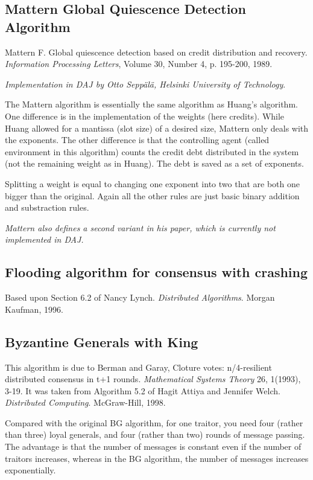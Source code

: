 \documentclass[11pt]{article}
\begin{document}
\subsection{Mattern Global Quiescence Detection Algorithm}

Mattern F.
Global quiescence detection based on credit distribution and recovery.
\emph{Information Processing Letters}, Volume 30, Number 4, p. 195-200, 1989.

\emph{Implementation in DAJ by Otto Sepp\"al\"a, Helsinki University of Technology}.

The Mattern algorithm is essentially the same algorithm as Huang's algorithm.
One difference is in the implementation of the weights (here credits). While
Huang allowed for a mantissa (slot size) of a desired size, Mattern only deals
with the exponents. The other difference is that the controlling agent (called
environment in this algorithm) counts the credit debt distributed in the system
(not the remaining weight as in Huang). The debt is saved as a set of exponents.

Splitting a weight is equal to changing one exponent into two that are both
one bigger than the original. Again all the other rules are just basic binary addition
 and substraction rules.

\emph{Mattern also defines a second variant in his paper, which is currently not implemented in DAJ.}


\subsection{Flooding algorithm for consensus with crashing}

Based upon Section 6.2 of Nancy Lynch. \emph{Distributed Algorithms}. Morgan Kaufman, 1996.

\subsection{Byzantine Generals with King}

This algorithm is due to Berman and Garay, Cloture votes: n/4-resilient
distributed consensus in t+1 rounds. \emph{Mathematical Systems Theory}
26, 1(1993), 3-19.
It was taken from Algorithm 5.2 of Hagit Attiya and Jennifer Welch.
\emph{Distributed Computing}. McGraw-Hill, 1998.


Compared with the original BG algorithm,
for one traitor, you need four (rather than three) loyal generals,
and four (rather than two) rounds of message passing.
The advantage is that the number of messages is constant even if
the number of traitors increases,
whereas in the BG algorithm, the number of messages increases
exponentially.
\end{document}
